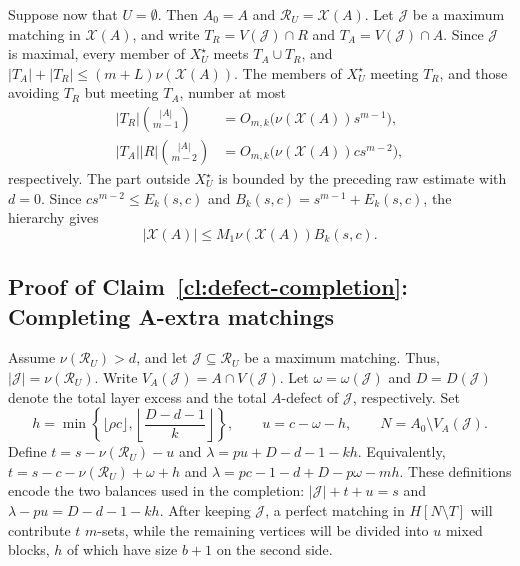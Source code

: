 \documentclass[10pt,a4paper]{article}
\numberwithin{equation}{section}
\theoremstyle{definition}
\newcommand{\X}{\mathcal X}
\newcommand{\Rcal}{\mathcal R}
\begin{document}
Suppose now that $U=\emptyset$.  Then $A_0=A$ and
$\Rcal_U=\X(A)$.  Let $\mathcal J$ be a maximum matching in
$\X(A)$, and write $T_R=V(\mathcal J)\cap R$ and
$T_A=V(\mathcal J)\cap A$.
Since $\mathcal J$ is maximal, every member of $X_U^\star$
meets $T_A\cup T_R$, and
$|T_A|+|T_R|\le(m+L)\nu(\X(A))$.  The members of
$X_U^\star$ meeting $T_R$, and those avoiding $T_R$ but meeting
$T_A$, number at most
\[
        \begin{aligned}
                |T_R|\binom{|A|}{m-1}
                 & =O_{m,k}\bigl(\nu(\X(A))s^{m-1}\bigr),  \\
                |T_A||R|\binom{|A|}{m-2}
                 & =O_{m,k}\bigl(\nu(\X(A))cs^{m-2}\bigr),
        \end{aligned}
\]
respectively.
The part outside $X_U^\star$ is bounded by the preceding raw
estimate with $d=0$.  Since $cs^{m-2}\le E_k(s,c)$ and
$B_k(s,c)=s^{m-1}+E_k(s,c)$, the hierarchy gives
\[
        |\X(A)|
        \le M_1\nu(\X(A))B_k(s,c).
\]


\subsection{Proof of Claim~\ref{cl:defect-completion}: Completing A-extra matchings}

Assume $\nu(\Rcal_U)>d$, and let $\mathcal J\subseteq\Rcal_U$ be a maximum matching.
Thus, $|\mathcal J|=\nu(\Rcal_U)$.
Write $V_A(\mathcal J)=A\cap V(\mathcal J)$.
Let $\omega=\omega(\mathcal J)$ and $D=D(\mathcal J)$ denote the total layer excess and the total $A$-defect of $\mathcal J$, respectively.
Set
\[
        h=\min\left\{\lfloor\rho c\rfloor,
        \left\lfloor\frac{D-d-1}{k}\right\rfloor\right\},
        \qquad
        u=c-\omega-h,
        \qquad
        N=A_0\setminus V_A(\mathcal J).
\]
Define $t=s-\nu(\Rcal_U)-u$ and
$\lambda=pu+D-d-1-kh$.
Equivalently,
$t=s-c-\nu(\Rcal_U)+\omega+h$ and
$\lambda=pc-1-d+D-p\omega-mh$.
These definitions encode the two balances used in the completion:
$|\mathcal J|+t+u=s$ and
$\lambda-pu=D-d-1-kh$.
After keeping $\mathcal J$, a perfect matching in $H[N\setminus T]$
will contribute $t$ $m$-sets, while the remaining vertices will be
divided into $u$ mixed blocks, $h$ of which have size $b+1$ on the
second side.
\end{document}
